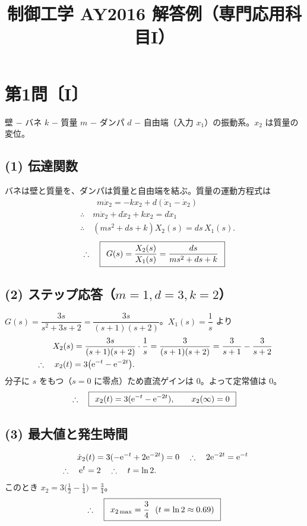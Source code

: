\documentclass[11pt,a4paper]{article}
\title{制御工学 AY2016 解答例（専門応用科目I）}
\author{}
\date{}
\begin{document}
\maketitle

\section*{第1問〔I〕}

壁 $-$ バネ $k$ $-$ 質量 $m$ $-$ ダンパ $d$ $-$ 自由端（入力 $x_1$）の振動系。$x_2$ は質量の変位。

\subsection*{(1) 伝達関数}
バネは壁と質量を、ダンパは質量と自由端を結ぶ。質量の運動方程式は
\begin{align*}
  &\qquad m\ddot{x}_2=-k x_2+d(\dot{x}_1-\dot{x}_2)\\
  &\therefore\quad m\ddot{x}_2+d\dot{x}_2+k x_2=d\dot{x}_1\\
  &\therefore\quad (ms^2+ds+k)X_2(s)=ds\,X_1(s).
\end{align*}
\[
  \therefore\quad \boxed{\,\;G(s)=\dfrac{X_2(s)}{X_1(s)}=\dfrac{ds}{ms^2+ds+k}\;\,}
\]

\subsection*{(2) ステップ応答（$m=1,d=3,k=2$）}
$G(s)=\dfrac{3s}{s^2+3s+2}=\dfrac{3s}{(s+1)(s+2)}$。$X_1(s)=\dfrac1s$ より
\begin{align*}
  &\qquad X_2(s)=\frac{3s}{(s+1)(s+2)}\cdot\frac1s=\frac{3}{(s+1)(s+2)}
   =\frac{3}{s+1}-\frac{3}{s+2}\\
  &\therefore\quad x_2(t)=3\bigl(\mathrm{e}^{-t}-\mathrm{e}^{-2t}\bigr).
\end{align*}
分子に $s$ をもつ（$s=0$ に零点）ため直流ゲインは $0$。よって定常値は $0$。
\[
  \therefore\quad \boxed{\,\;x_2(t)=3(\mathrm{e}^{-t}-\mathrm{e}^{-2t}),\qquad x_2(\infty)=0\;\,}
\]

\subsection*{(3) 最大値と発生時間}
\begin{align*}
  &\qquad \dot{x}_2(t)=3(-\mathrm{e}^{-t}+2\mathrm{e}^{-2t})=0
   \quad\therefore\quad 2\mathrm{e}^{-2t}=\mathrm{e}^{-t}\\
  &\therefore\quad \mathrm{e}^{t}=2
   \quad\therefore\quad t=\ln 2.
\end{align*}
このとき $x_2=3\bigl(\tfrac12-\tfrac14\bigr)=\tfrac34$。
\[
  \therefore\quad \ans{\;x_{2\max}=\dfrac34\ \ (t=\ln2\approx0.69)\;}
\]
\end{document}
